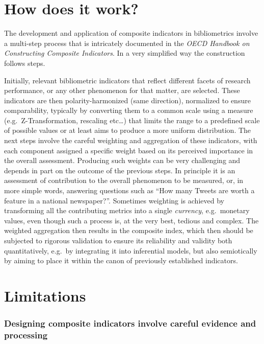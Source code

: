 \documentclass[
  letterpaper,
]{scrreprt}
\begin{document}
\section{How does it work?}\label{how-does-it-work-3}

The development and application of composite indicators in bibliometrics
involve a multi-step process that is intricately documented in the
\emph{OECD Handbook on Constructing Composite Indicators}. In a very
simplified way the construction follows steps.

Initially, relevant bibliometric indicators that reflect different
facets of research performance, or any other phenomenon for that matter,
are selected. These indicators are then polarity-harmonized (same
direction), normalized to ensure comparability, typically by converting
them to a common scale using a measure (e.g.~Z-Transformation, rescaling
etc\ldots) that limits the range to a predefined scale of possible
values or at least aims to produce a more uniform distribution. The next
steps involve the careful weighting and aggregation of these indicators,
with each component assigned a specific weight based on its perceived
importance in the overall assessment. Producing such weights can be very
challenging and depends in part on the outcome of the previous steps. In
principle it is an assessment of contribution to the overall phenomenon
to be measured, or, in more simple words, answering questions such as
``How many Tweets are worth a feature in a national newspaper?''.
Sometimes weighting is achieved by transforming all the contributing
metrics into a single \emph{currency}, e.g.~monetary values, even though
such a process is, at the very best, tedious and complex. The weighted
aggregation then results in the composite index, which then should be
subjected to rigorous validation to ensure its reliability and validity
both quantitatively, e.g.~by integrating it into inferential models, but
also semiotically by aiming to place it within the canon of previously
established indicators.

\section{Limitations}\label{limitations-5}

\subsubsection{Designing composite indicators involve careful evidence
and
processing}\label{designing-composite-indicators-involve-careful-evidence-and-processing}
\end{document}
